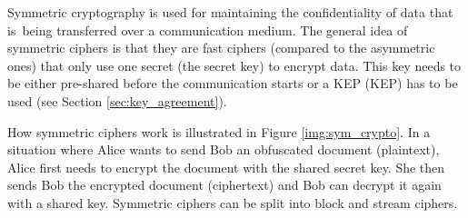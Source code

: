 Symmetric cryptography is used for maintaining the confidentiality of data that is~being transferred over a communication medium. The general idea of symmetric ciphers is that they are fast ciphers (compared to the asymmetric ones) that only use one secret (the secret key) to encrypt data. This key needs to be either pre-shared before the communication starts or a KEP ({\acl{KEP}}) has to be used (see Section \ref{sec:key_agreement}). \cite{Ristic2014}

How symmetric ciphers work is illustrated in Figure \ref{img:sym_crypto}. In a situation where Alice wants to send Bob an obfuscated document (plaintext), Alice first needs to encrypt the document with the shared secret key. She then sends Bob the encrypted document (ciphertext) and Bob can decrypt it again with a shared key. Symmetric ciphers can be split into block and stream ciphers.

